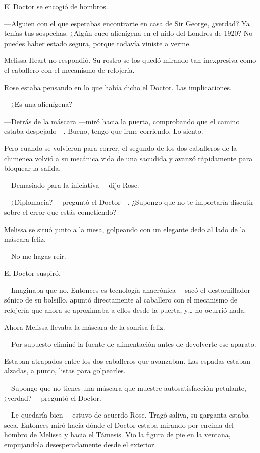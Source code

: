 {El Doctor se encogió de hombros.}

{---Alguien con el que esperabas encontrarte en casa de Sir George,
	¿verdad? Ya tenías tus sospechas. ¿Algún cuco alienígena en el nido del
	Londres de 1920? No puedes haber estado segura, porque todavía viniste
a verme.}

{Melissa Heart no respondió. Su rostro se los quedó mirando tan
inexpresiva como el caballero con el mecanismo de relojería.}

{Rose estaba pensando en lo que había dicho el Doctor. Las
implicaciones.}

{---¿Es una alienígena?}

{---Detrás de la máscara ---miró hacia la puerta, comprobando que el
camino estaba despejado---. Bueno, tengo que irme corriendo. Lo siento.}

{Pero cuando se volvieron para correr, el segundo de los dos caballeros
	de la chimenea volvió a su mecánica vida de una sacudida y avanzó
rápidamente para bloquear la salida.}

{---Demasiado para la iniciativa ---dijo Rose.}

{---¿Diplomacia? ---preguntó el Doctor---. ¿Supongo que no te importaría
discutir sobre el error que estás cometiendo?}

{Melissa se situó junto a la mesa, golpeando con un elegante dedo al
lado de la máscara feliz.}

{---No me hagas reír.}

{El Doctor suspiró.}

{---Imaginaba que no. Entonces es tecnología anacrónica ---sacó el
	destornillador sónico de su bolsillo, apuntó directamente al caballero
	con el mecanismo de relojería que ahora se aproximaba a ellos desde la
	puerta, y\ldots{} no ocurrió nada.}

{Ahora Melissa llevaba la máscara de la sonrisa feliz.}

{---Por supuesto eliminé la fuente de alimentación antes de devolverte
ese aparato.}

{Estaban atrapados entre los dos caballeros que avanzaban. Las espadas
estaban alzadas, a punto, listas para golpearles.}

{---Supongo que no tienes una máscara que muestre autosatisfacción
petulante, ¿verdad? ---preguntó el Doctor.}

{---Le quedaría bien ---estuvo de acuerdo Rose. Tragó saliva, su
	garganta estaba seca. Entonces miró hacia dónde el Doctor estaba mirando
	por encima del hombro de Melissa y hacia el Támesis. Vio la figura de
pie en la ventana, empujandola desesperadamente desde el exterior.}

